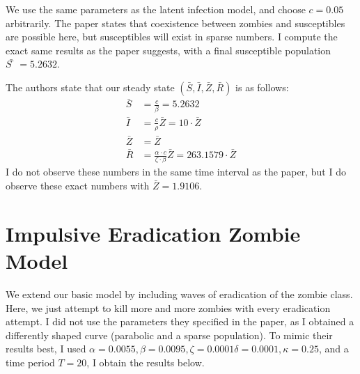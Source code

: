 \documentclass[]{article}
\begin{document}
We use the same parameters as the latent infection model, and choose $c = 0.05$
arbitrarily. The paper states that coexistence between zombies and susceptibles are
possible here, but susceptibles will exist in sparse numbers. I compute the exact same
results as the paper suggests, with a final susceptible population $\bar{S̅}= 5.2632$.
\begin{figure}[H]
\end{figure}
The authors state that our steady state $(\bar{S}, \bar{I}, \bar{Z}, \bar{R})$ is as follows:
\begin{equation}
    \begin{aligned}
        \bar{S} &= \frac{c}{\beta} = 5.2632 \\
        \bar{I} &= \frac{c}{\rho} \bar{Z} = 10 \cdot \bar{Z} \\
        \bar{Z} &= \bar{Z} \\
        \bar{R} &= \frac{\alpha \cdot c}{\zeta \cdot \beta} \bar{Z} = 263.1579 \cdot \bar{Z}
    \end{aligned}
\end{equation}
I do not observe these numbers in the same time interval as the paper, but I do observe these exact numbers with $\bar{Z} = 1.9106$.

\section{Impulsive Eradication Zombie Model}
We extend our basic model by including waves of eradication of the zombie class.
Here, we just attempt to kill more and more zombies with every eradication attempt. I
did not use the parameters they specified in the paper, as I obtained a differently shaped
curve (parabolic and a sparse population). To mimic their results best, I used $\alpha =
0.0055, \beta = 0.0095, \zeta = 0.0001 \delta = 0.0001, \kappa = 0.25$, and a time period $T = 20$, I
obtain the results below.
\end{document}
